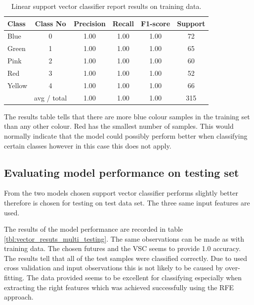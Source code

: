 \documentclass[11pt]{article}
\begin{document}
			\begin{center}
			  	\begin{table}[h]
			  	\centering
				\begin{tabular}[b]{| l | c | c | c | c | c |}
					\hline
					Class & Class No & Precision &  Recall & F1-score & Support  \\
		 			\hline
					Blue & 0  &   1.00   &   1.00   &   1.00   &   72 \\
          			Green & 1  &   1.00   &   1.00   &   1.00   &    65 \\
         			Pink & 2  &   1.00   &   1.00   &   1.00   &     60 \\
          			Red & 3  &   1.00   &   1.00   &   1.00   &     52 \\
          			Yellow & 4  &   1.00   &   1.00   &   1.00   &     66 \\
          			\hline
					 & avg / total   &   1.00   &   1.00   &   1.00  &      315 \\
					\hline
				\end{tabular}
				\caption{Linear support vector classifier report results on training data.}
				\label{tbl:vector_resuts_multi}
				\end{table}
			\end{center}
			\vspace*{-1.3cm}

 			 The results table tells that there are more blue colour samples in the training set than any other colour. Red has the smallest number of samples. This would normally indicate that the model could possibly perform better when classifying certain classes however in this case this does not apply.

		\subsection{Evaluating model performance on testing set}

			From the two models chosen support vector classifier performs slightly better therefore is chosen for testing on test data set. The three same input features are used.

			The results of the model performance are recorded in table \ref{tbl:vector_resuts_multi_testing}. The same observations can be made as with training data. The chosen futures and the VSC seems to provide 1.0 accuracy. The results tell that all of the test samples were classified correctly. Due to used cross validation and input observations this is not likely to be caused by over-fitting. The data provided seems to be excellent for classifying especially when extracting the right features which was achieved successfully using the RFE approach.  
\end{document}
